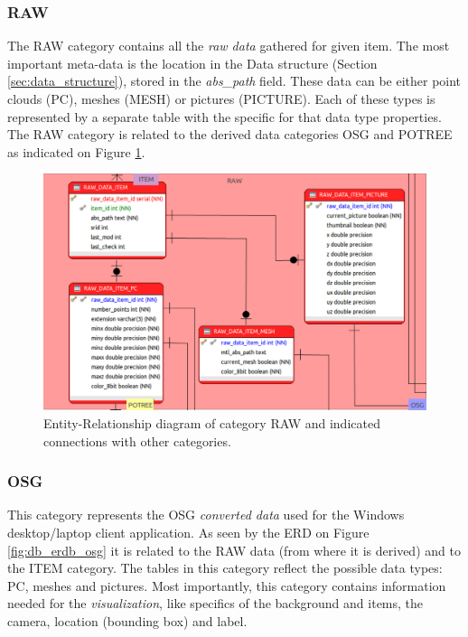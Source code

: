 \subsubsection{RAW}
The RAW category contains all the \textit{raw data} gathered for given item. The most important meta-data is the location in the Data structure (Section \ref{sec:data_structure}), stored in the {\em abs\_path} field. These data can be either point clouds (PC), meshes (MESH) or pictures (PICTURE). Each of these types is represented by a separate table with the specific for that data type properties. The RAW category is related to the derived data categories OSG and POTREE as indicated on Figure \ref{fig:db_erdb_raw}. 
\begin{figure}[H]
\centering
\includegraphics[scale=0.35]{fig/database/ERDB_RAW_conn.pdf}
\caption{Entity-Relationship diagram of category RAW and indicated connections with other categories.}
\label{fig:db_erdb_raw}
\end{figure}

\subsubsection{OSG}
This category represents the OSG \textit{converted data} used for the Windows desktop/laptop client application. As seen by the ERD on Figure \ref{fig:db_erdb_osg} it is related to the RAW data (from where it is derived) and to the ITEM category. The tables in this category reflect the possible data types: PC, meshes and pictures. Most importantly, this category contains information needed for the \textit{visualization}, like specifics of the background and items, the camera, location (bounding box) and label. 

